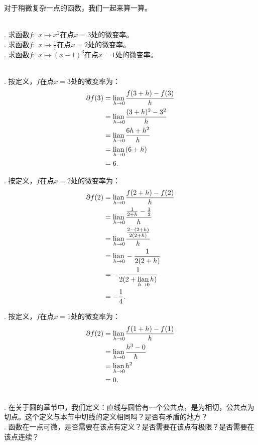 \documentclass[12pt,UTF8]{ctexbook}
\begin{document}
对于稍微复杂一点的函数，我们一起来算一算。

\begin{et}
    \mbox{} \\
    . 求函数$f: \,\, x \mapsto x^2$在点$x = 3$处的微变率。\\
    . 求函数$f: \,\, x \mapsto \frac{1}{x}$在点$x = 2$处的微变率。\\
    . 求函数$f: \,\, x \mapsto (x - 1)^3$在点$x = 1$处的微变率。
\end{et}

\begin{so}
    \mbox{} \\
    . 按定义，$f$在点$x = 3$处的微变率为：
    \begin{align*}
        \partial f(3) &= \underset{h\to 0}{\operatorname{lian}\,}\frac{f(3 + h) - f(3)}{h}  \\
        &= \underset{h\to 0}{\operatorname{lian}\,}\frac{(3 + h)^2 - 3^2}{h}  \\
        &= \underset{h\to 0}{\operatorname{lian}\,}\frac{6h + h^2}{h}  \\
        &= \underset{h\to 0}{\operatorname{lian}\,}(6 + h)  \\
        &= 6.  
    \end{align*}

    . 按定义，$f$在点$x = 2$处的微变率为：
    \begin{align*}
        \partial f(2) &= \underset{h\to 0}{\operatorname{lian}\,}\frac{f(2 + h) - f(2)}{h}  \\
        &= \underset{h\to 0}{\operatorname{lian}\,}\frac{\frac{1}{2+h} - \frac{1}{2}}{h}  \\
        &= \underset{h\to 0}{\operatorname{lian}\,}\frac{\frac{2 - (2 + h)}{2(2 + h)}}{h}  \\
        &= \underset{h\to 0}{\operatorname{lian}\,}-\frac{1}{2(2 + h)}  \\
        &= -\frac{1}{2(2 + \underset{h\to 0}{\operatorname{lian}\,}h)}  \\
        &= -\frac{1}{4}. 
    \end{align*}

    . 按定义，$f$在点$x = 1$处的微变率为：
    \begin{align*}
        \partial f(2) &= \underset{h\to 0}{\operatorname{lian}\,}\frac{f(1 + h) - f(1)}{h}  \\
        &= \underset{h\to 0}{\operatorname{lian}\,}\frac{h^3 - 0}{h}  \\
        &= \underset{h\to 0}{\operatorname{lian}\,}h^2  \\
        &= 0. 
    \end{align*}
\end{so}

\begin{sk}
    \mbox{} \\
    . 在关于圆的章节中，我们定义：直线与圆恰有一个公共点，是为相切，公共点为切点。这个定义与本节中切线的定义相同吗？是否有矛盾的地方？\\
    . 函数在一点可微，是否需要在该点有定义？是否需要在该点有极限？是否需要在该点连续？
\end{sk}
\end{document}
